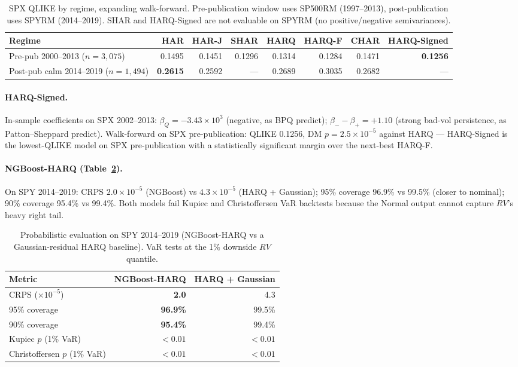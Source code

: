 \documentclass[10pt,letterpaper]{article}
\begin{document}
\begin{table}[tb]
\centering\small
\caption{SPX QLIKE by regime, expanding walk-forward. Pre-publication window uses SP500RM (1997--2013), post-publication uses SPYRM (2014--2019). SHAR and HARQ-Signed are not evaluable on SPYRM (no positive/negative semivariances).}
\label{tab:regime-qlike}
\begin{tabular}{lrrrrrrr}
\toprule
Regime & HAR & HAR-J & SHAR & HARQ & HARQ-F & CHAR & HARQ-Signed \\
\midrule
Pre-pub 2000--2013 ($n{=}3{,}075$)       & 0.1495 & 0.1451 & 0.1296 & 0.1314 & 0.1284 & 0.1471 & \textbf{0.1256} \\
Post-pub calm 2014--2019 ($n{=}1{,}494$) & \textbf{0.2615} & 0.2592 & --- & 0.2689 & 0.3035 & 0.2682 & --- \\
\bottomrule
\end{tabular}
\end{table}


\paragraph{HARQ-Signed.} In-sample coefficients on SPX 2002--2013: $\beta_Q = -3.43\times 10^{3}$ (negative, as BPQ predict); $\beta_- - \beta_+ = +1.10$ (strong bad-vol persistence, as Patton--Sheppard predict). Walk-forward on SPX pre-publication: QLIKE 0.1256, DM $p = 2.5\times 10^{-5}$ against HARQ --- HARQ-Signed is the lowest-QLIKE model on SPX pre-publication with a statistically significant margin over the next-best HARQ-F.

\paragraph{NGBoost-HARQ (Table~\ref{tab:prob}).} On SPY 2014--2019: CRPS $2.0\times 10^{-5}$ (NGBoost) vs $4.3\times 10^{-5}$ (HARQ + Gaussian); 95\% coverage 96.9\% vs 99.5\% (closer to nominal); 90\% coverage 95.4\% vs 99.4\%. Both models fail Kupiec and Christoffersen VaR backtests because the Normal output cannot capture $RV$'s heavy right tail.

\begin{table}[tb]
\centering\small
\caption{Probabilistic evaluation on SPY 2014--2019 (NGBoost-HARQ vs a Gaussian-residual HARQ baseline). VaR tests at the 1\% downside $RV$ quantile.}
\label{tab:prob}
\begin{tabular}{lrr}
\toprule
Metric & NGBoost-HARQ & HARQ + Gaussian \\
\midrule
CRPS ($\times 10^{-5}$)       & \textbf{2.0}    & 4.3    \\
95\% coverage                 & \textbf{96.9\%} & 99.5\% \\
90\% coverage                 & \textbf{95.4\%} & 99.4\% \\
Kupiec $p$ (1\% VaR)          & $<0.01$         & $<0.01$ \\
Christoffersen $p$ (1\% VaR)  & $<0.01$         & $<0.01$ \\
\bottomrule
\end{tabular}
\end{table}
\end{document}
